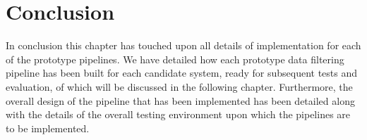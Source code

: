 



\section{Conclusion} %
\label{sub:implement_conclusion}

In conclusion this chapter has touched upon all details of implementation for each of the prototype pipelines.
We have detailed how each prototype data filtering pipeline has been built for each candidate system, ready
for subsequent tests and evaluation, of which will be discussed in the following chapter. Furthermore, the overall
design of the pipeline that has been implemented has been detailed along with the details of the overall testing
environment upon which the pipelines are to be implemented.

